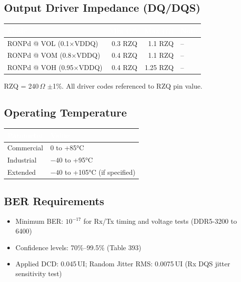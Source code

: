 \documentclass[10pt,a4paper,twoside]{article}
\newcommand{\thd}[1]{\cellcolor{navyblue}\textcolor{white}{\textbf{#1}}}
\newcommand{\trow}{\rowcolor{lightgray}}
\newcommand{\talt}{\rowcolor{skyblue!30}}
\begin{document}
\subsection{Output Driver Impedance (DQ/DQS)}

\begin{center}
\begin{tabularx}{0.7\linewidth}{@{} l r r l @{}}
\toprule
\thd{Mode} & \thd{Min ($\Omega$)} & \thd{Max ($\Omega$)} & \thd{Note} \\
\midrule
\trow RONPd @ VOL (0.1$\times$VDDQ) & 0.3 RZQ & 1.1 RZQ & -- \\
\talt RONPd @ VOM (0.8$\times$VDDQ) & 0.4 RZQ & 1.1 RZQ & -- \\
\trow RONPd @ VOH (0.95$\times$VDDQ) & 0.4 RZQ & 1.25 RZQ & -- \\
\bottomrule
\end{tabularx}
\end{center}

RZQ = 240\,$\Omega$ $\pm$1\%. All driver codes referenced to RZQ pin value.

\subsection{Operating Temperature}

\begin{center}
\begin{tabularx}{0.6\linewidth}{@{} l l @{}}
\toprule
\thd{Parameter} & \thd{Value} \\
\midrule
\trow Commercial & 0 to +85°C \\
\talt Industrial & $-40$ to +95°C \\
\trow Extended & $-40$ to +105°C (if specified) \\
\bottomrule
\end{tabularx}
\end{center}

\subsection{BER Requirements}

\begin{itemize}
  \item Minimum BER: $10^{-17}$ for Rx/Tx timing and voltage tests (DDR5-3200 to 6400)
  \item Confidence levels: 70\%--99.5\% (Table 393)
  \item Applied DCD: 0.045\,UI; Random Jitter RMS: 0.0075\,UI (Rx DQS jitter sensitivity test)
\end{itemize}
\end{document}
